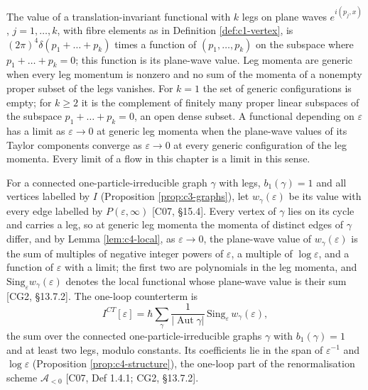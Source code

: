 The value of a translation-invariant functional with $k$ legs on plane waves $e^{i(p_j,x)}$, $j=1,\dots,k$, with fibre elements as in Definition \ref{def:c1-vertex}, is $(2\pi)^4\delta(p_1+\dots+p_k)$ times a function of $(p_1,\dots,p_k)$ on the subspace where $p_1+\dots+p_k=0$; this function is its plane-wave value. Leg momenta are generic when every leg momentum is nonzero and no sum of the momenta of a nonempty proper subset of the legs vanishes. For $k=1$ the set of generic configurations is empty; for $k\ge2$ it is the complement of finitely many proper linear subspaces of the subspace $p_1+\dots+p_k=0$, an open dense subset. A functional depending on $\varepsilon$ has a limit as $\varepsilon\to0$ at generic leg momenta when the plane-wave values of its Taylor components converge as $\varepsilon\to0$ at every generic configuration of the leg momenta. Every limit of a flow in this chapter is a limit in this sense.

\begin{definition}
\label{def:c4-ict}
For a connected one-particle-irreducible graph $\gamma$ with legs, $b_1(\gamma)=1$ and all vertices labelled by $I$ (Proposition \ref{prop:c3-graphs}), let $w_\gamma(\varepsilon)$ be its value with every edge labelled by $P(\varepsilon,\infty)$ [C07, §15.4]. Every vertex of $\gamma$ lies on its cycle and carries a leg, so at generic leg momenta the momenta of distinct edges of $\gamma$ differ, and by Lemma \ref{lem:c4-local}, as $\varepsilon\to0$, the plane-wave value of $w_\gamma(\varepsilon)$ is the sum of multiples of negative integer powers of $\varepsilon$, a multiple of $\log\varepsilon$, and a function of $\varepsilon$ with a limit; the first two are polynomials in the leg momenta, and $\mathrm{Sing}_\varepsilon w_\gamma(\varepsilon)$ denotes the local functional whose plane-wave value is their sum [CG2, §13.7.2]. The one-loop counterterm is
\begin{equation}
I^{CT}[\varepsilon]=\hbar\sum_\gamma\frac{1}{|\operatorname{Aut}\gamma|}\,\mathrm{Sing}_\varepsilon\,w_\gamma(\varepsilon),
\label{eq:c4-ict}
\end{equation}
the sum over the connected one-particle-irreducible graphs $\gamma$ with $b_1(\gamma)=1$ and at least two legs, modulo constants. Its coefficients lie in the span of $\varepsilon^{-1}$ and $\log\varepsilon$ (Proposition \ref{prop:c4-structure}), the one-loop part of the renormalisation scheme $\mathscr A_{<0}$ [C07, Def 1.4.1; CG2, §13.7.2].
\end{definition}

